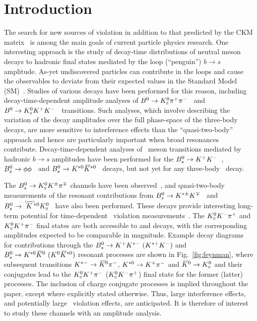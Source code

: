\section{Introduction}
\label{sec:Introduction}

The search for new sources of \CP violation in addition to that predicted by 
the CKM matrix~\cite{Cabibbo:1963yz,Kobayashi:1973fv} is among the main goals of current particle physics research.
One interesting approach is the study of decay-time distributions of neutral \B meson decays to hadronic final states mediated by the loop (``penguin'') $b \to s$ amplitude.  
As-yet undiscovered particles can contribute in the loops and cause the observables to deviate from their expected values 
in the Standard Model (SM)~\cite{Grossman:1996ke,Fleischer:1996bv,London:1997zk,Ciuchini:1997zp}.
Studies of various \Bz decays have been performed for this reason, including decay-time-dependent amplitude analyses of $B^0 \rightarrow {\ensuremath{{K}^0_{\mathrm{ \scriptscriptstyle S}}}}\pi^+\pi^-$~\cite{Dalseno:2008wwa,Aubert:2009me} and $B^0 \rightarrow {\ensuremath{{K}^0_{\mathrm{ \scriptscriptstyle S}}}} K^+K^-$~\cite{Nakahama:2010nj,Lees:2012kxa} transitions.
Such analyses, which involve describing the variation of the decay amplitudes over the full phase-space of the three-body decays, are more sensitive to interference effects than the ``quasi-two-body'' approach and hence are particularly important when broad resonances contribute.
Decay-time-dependent analyses of \Bs\ meson transitions mediated by hadronic $b \to s$ amplitudes have been performed for the ${{B}^0_{s}} \rightarrow {\ensuremath{{K}^+}}{\ensuremath{{K}^-}}$~\cite{LHCb-PAPER-2018-006}, ${{B}^0_{s}}\rightarrow\phi\phi$~\cite{LHCb-PAPER-2014-026,LHCb-CONF-2018-001} and ${{B}^0_{s}}\rightarrow{\ensuremath{{K}^{*0}}}{\ensuremath{{\kern 0.2em\overline{\kern -0.2em K}{}}{}^{*0}}}$~\cite{LHCb-PAPER-2017-048} decays, but not yet for any three-body \Bs\ decay.

The ${{B}^0_{s}}\rightarrow{\ensuremath{{K}^0_{\mathrm{ \scriptscriptstyle S}}}}{\ensuremath{{K}^\pm}}{\ensuremath{{\pi}^\mp}}$ channels have been observed~\cite{LHCb-PAPER-2013-042,LHCb-PAPER-2017-010}, and quasi-two-body measurements of the resonant contributions from ${{B}^0_{s}}\rightarrow{\ensuremath{{K}^{*\pm}}}{\ensuremath{{K}^\mp}}$~\cite{LHCb-PAPER-2014-043} and $\Bs\to\KstarzorKstarzb\KS$~\cite{LHCb-PAPER-2015-018} have also been performed.
These decays provide interesting long-term potential for time-dependent \CP\ violation measurements~\cite{Gronau:2006qn}.
The ${{K}^0_{\mathrm{ \scriptscriptstyle S}}}{{K}^-}{{\pi}^+}$ and ${{K}^0_{\mathrm{ \scriptscriptstyle S}}}{{K}^+}{{\pi}^-}$ final states are both accessible to \Bs and \Bsb decays, with the corresponding amplitudes expected to be comparable in magnitude.
Example decay diagrams for contributions through the ${{B}^0_{s}} \rightarrow {\ensuremath{{K}^+}}{\ensuremath{{K}^{*-}}}~({{K}^{*+}}{{K}^-})$ and ${{B}^0_{s}} \rightarrow {\ensuremath{{K}^{*0}}}{\ensuremath{{\kern 0.2em\overline{\kern -0.2em K}{}}{}^0}}~({{K}^0}{{\kern 0.2em\overline{\kern -0.2em K}{}}{}^{*0}})$ resonant processes are shown in Fig.~\ref{fig:feynman}, where subsequent transitions ${{K}^{*-}} \rightarrow {\ensuremath{{\kern 0.2em\overline{\kern -0.2em K}{}}{}^0}}{\ensuremath{{\pi}^-}}$, ${{K}^{*0}} \rightarrow {\ensuremath{{K}^+}}{\ensuremath{{\pi}^-}}$ and ${{\kern 0.2em\overline{\kern -0.2em K}{}}{}^0} \rightarrow {\ensuremath{{K}^0_{\mathrm{ \scriptscriptstyle S}}}}$ and their conjugates lead to the ${{K}^0_{\mathrm{ \scriptscriptstyle S}}}{{K}^+}{{\pi}^-}$ (${{K}^0_{\mathrm{ \scriptscriptstyle S}}}{{K}^-}{{\pi}^+}$) final state for the former (latter) processes. 
The inclusion of charge conjugate processes is implied throughout the paper, except where explicitly stated otherwise.
Thus, large interference effects, and potentially large \CP\ violation effects, are anticipated.  
It is therefore of interest to study these channels with an amplitude analysis.

